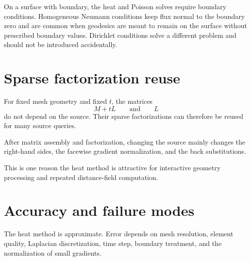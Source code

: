 On a surface with boundary, the heat and Poisson solves require boundary
conditions.  Homogeneous Neumann conditions keep flux normal to the boundary
zero and are common when geodesics are meant to remain on the surface without
prescribed boundary values.  Dirichlet conditions solve a different problem and
should not be introduced accidentally.

\section{Sparse factorization reuse}

For fixed mesh geometry and fixed \(t\), the matrices
\[
M+tL
\qquad\text{and}\qquad
L
\]
do not depend on the source.  Their sparse factorizations can therefore be reused
for many source queries.

\begin{proposition}\label{prop:vii40-reuse}
After matrix assembly and factorization, changing the source mainly changes the
right-hand sides, the facewise gradient normalization, and the back substitutions.
\end{proposition}

This is one reason the heat method is attractive for interactive geometry
processing and repeated distance-field computation.

\section{Accuracy and failure modes}

The heat method is approximate.  Error depends on mesh resolution, element
quality, Laplacian discretization, time step, boundary treatment, and the
normalization of small gradients.

